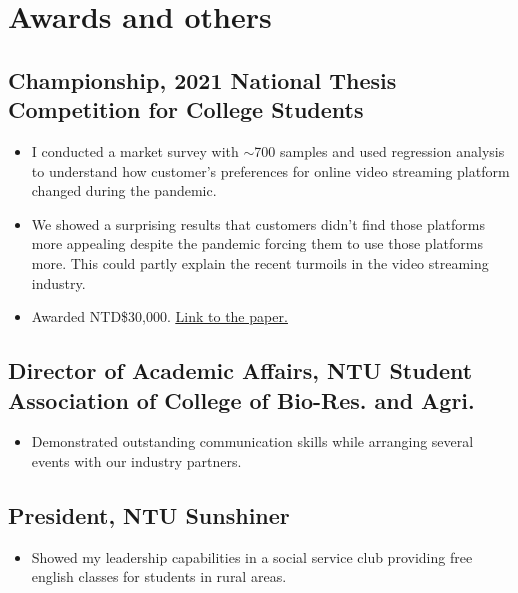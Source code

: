 \documentclass[12pt]{article}
\begin{document}
    \section*{Awards and others}
    \subsection*{Championship, 2021 National Thesis Competition for College Students}
    {\sffamily
    \begin{itemize}
        \item I conducted a market survey with $\sim$700 samples and used regression analysis to understand how customer's preferences for online video streaming platform changed during the pandemic.
        \item We showed a surprising results that customers didn't find those platforms more appealing despite the pandemic forcing them to use those platforms more.
        This could partly explain the recent turmoils in the video streaming industry. 
        \item Awarded NTD\$30,000. \href{https://bencer3283.github.io/experiences/covidthesis/}{\underline{Link to the paper.}}
    \end{itemize}
    }
    
    \subsection*{Director of Academic Affairs, NTU Student Association of College of Bio-Res. and Agri.}
    {\sffamily \begin{itemize}
        \item Demonstrated outstanding communication skills while arranging several events with our industry partners.
    \end{itemize}}
    \subsection*{President, NTU Sunshiner}
    {\sffamily 
    \begin{itemize}
        \item Showed my leadership capabilities in a social service club providing free english classes for students in rural areas.
    \end{itemize} }
    
\end{document}
